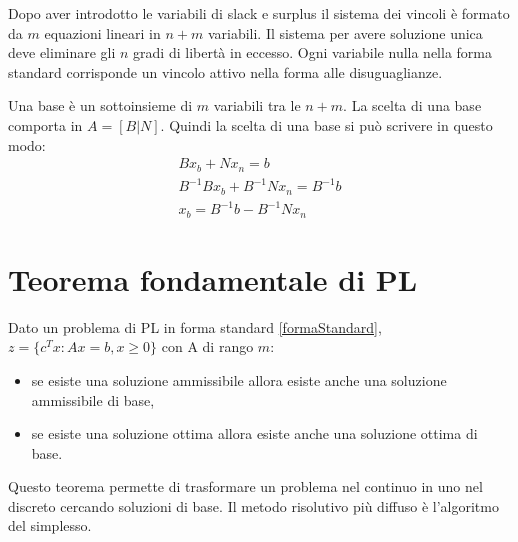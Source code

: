 Dopo aver introdotto le variabili di slack e surplus il sistema dei vincoli è formato da $m$ equazioni lineari in $n+m$ variabili. 
Il sistema per avere soluzione unica deve eliminare gli $n$ gradi di libertà in eccesso. Ogni variabile nulla nella forma standard corrisponde un vincolo attivo nella forma alle disuguaglianze.

Una base è un sottoinsieme di $m$ variabili tra le $n+m$. La scelta di una base comporta in $A=[B|N]$. Quindi la scelta di una base si può scrivere in questo modo:
\begin{equation}\label{sceltaBase}
    \begin{array}{c}
    Bx_b+Nx_n=b \\
    B^{-1}Bx_b+B^{-1}Nx_n=B^{-1}b \\
    x_b=B^{-1}b-B^{-1}Nx_n
    \end{array}
\end{equation}

\section{Teorema fondamentale di PL}
Dato un problema di PL in forma standard \ref{formaStandard}, $z=\{c^Tx:Ax=b, x\geq0\}$ con A di rango $m$:
\begin{itemize}
    \item se esiste una soluzione ammissibile allora esiste anche una soluzione ammissibile di base,
    \item se esiste una soluzione ottima allora esiste anche una soluzione ottima di base.
\end{itemize}
Questo teorema permette di trasformare un problema nel continuo in uno nel discreto cercando soluzioni di base. 
Il metodo risolutivo più diffuso è l'algoritmo del simplesso.
